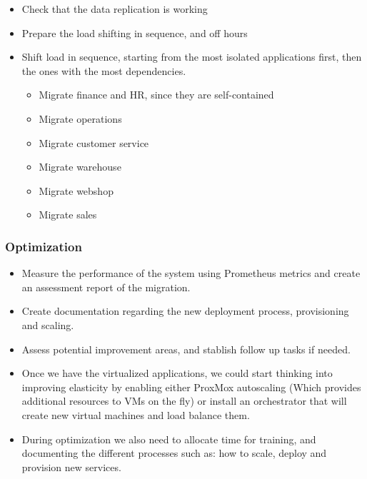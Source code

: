 \documentclass{llncs}
\begin{document}
\begin{itemize}
    \item Check that the data replication is working
    \item Prepare the load shifting in sequence, and off hours
    \item Shift load in sequence, starting from the most isolated applications first, then the ones with the most dependencies.
          \begin{itemize}
              \item Migrate finance and HR, since they are self-contained
              \item Migrate operations
              \item Migrate customer service
              \item Migrate warehouse
              \item Migrate webshop
              \item Migrate sales
          \end{itemize}
\end{itemize}

\subsubsection*{Optimization}

\begin{itemize}
    \item Measure the performance of the system using Prometheus metrics and create an assessment report of the migration.

    \item Create documentation regarding the new deployment process, provisioning and scaling.

    \item Assess potential improvement areas, and stablish follow up tasks if needed.

    \item Once we have the virtualized applications, we could start thinking into improving elasticity by enabling either ProxMox autoscaling (Which provides additional resources to VMs on the fly) or install an orchestrator that will create new virtual machines and load balance them.

    \item During optimization we also need to allocate time for training, and documenting the different processes such as: how to scale, deploy and provision new services.
\end{itemize}
\end{document}
